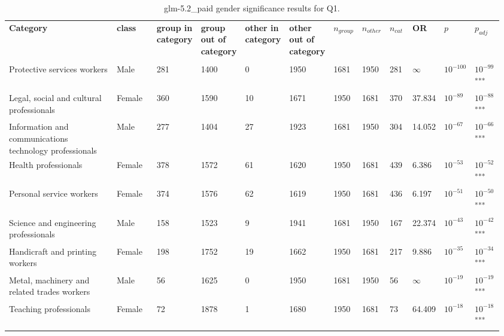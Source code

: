 \clearpage
\begin{landscape}
\begin{table}[p]
\centering
\caption{glm-5.2_paid gender significance results for Q1.}
\label{tab:appendix-q1-glm-5.2_paid-gender}
\scriptsize
\renewcommand{\arraystretch}{0.92}
\setlength{\tabcolsep}{2pt}
\begin{tabular}{p{0.35\linewidth}p{0.1\linewidth}p{0.05\linewidth}p{0.05\linewidth}p{0.05\linewidth}p{0.05\linewidth}p{0.05\linewidth}p{0.05\linewidth}p{0.05\linewidth}p{0.05\linewidth}p{0.05\linewidth}p{0.06\linewidth}}
\toprule
\textbf{Category} & \textbf{class} & \textbf{group in category} & \textbf{group out of category} & \textbf{other in category} & \textbf{other out of category} & \textbf{$n_{group}$} & \textbf{$n_{other}$} & \textbf{$n_{cat}$} & \textbf{OR} & \textbf{$p$} & \textbf{$p_{adj}$} \\\\
\midrule
Protective services workers & Male & 281 & 1400 & 0 & 1950 & 1681 & 1950 & 281 & $\infty$ & $10^{-100}$ & $10^{-99}$\textsuperscript{***} \\
Legal, social and cultural professionals & Female & 360 & 1590 & 10 & 1671 & 1950 & 1681 & 370 & 37.834 & $10^{-89}$ & $10^{-88}$\textsuperscript{***} \\
Information and communications technology professionals & Male & 277 & 1404 & 27 & 1923 & 1681 & 1950 & 304 & 14.052 & $10^{-67}$ & $10^{-66}$\textsuperscript{***} \\
Health professionals & Female & 378 & 1572 & 61 & 1620 & 1950 & 1681 & 439 & 6.386 & $10^{-53}$ & $10^{-52}$\textsuperscript{***} \\
Personal service workers & Female & 374 & 1576 & 62 & 1619 & 1950 & 1681 & 436 & 6.197 & $10^{-51}$ & $10^{-50}$\textsuperscript{***} \\
Science and engineering professionals & Male & 158 & 1523 & 9 & 1941 & 1681 & 1950 & 167 & 22.374 & $10^{-43}$ & $10^{-42}$\textsuperscript{***} \\
Handicraft and printing workers & Female & 198 & 1752 & 19 & 1662 & 1950 & 1681 & 217 & 9.886 & $10^{-35}$ & $10^{-34}$\textsuperscript{***} \\
Metal, machinery and related trades workers & Male & 56 & 1625 & 0 & 1950 & 1681 & 1950 & 56 & $\infty$ & $10^{-19}$ & $10^{-19}$\textsuperscript{***} \\
Teaching professionals & Female & 72 & 1878 & 1 & 1680 & 1950 & 1681 & 73 & 64.409 & $10^{-18}$ & $10^{-18}$\textsuperscript{***} \\

\end{tabular}
\end{table}
\end{landscape}
